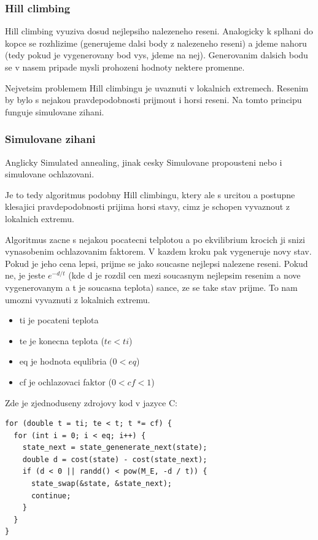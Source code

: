 \documentclass[12pt,a4paper]{article}
\begin{document}
\subsubsection{Hill climbing}
Hill climbing vyuziva dosud nejlepsiho nalezeneho reseni. Analogicky k splhani do kopce se rozhlizime (generujeme dalsi body z nalezeneho reseni) a jdeme nahoru (tedy pokud je vygenerovany bod vys, jdeme na nej). Generovanim dalsich bodu se v nasem pripade mysli prohozeni hodnoty nektere promenne.

Nejvetsim problemem Hill climbingu je uvaznuti v lokalnich extremech. Resenim by bylo s nejakou pravdepodobnosti prijmout i horsi reseni. Na tomto principu funguje simulovane zihani.

\subsubsection{Simulovane zihani}
Anglicky Simulated annealing, jinak cesky Simulovane propousteni nebo i simulovane ochlazovani.

Je to tedy algoritmus podobny Hill climbingu, ktery ale s urcitou a postupne klesajici pravdepodobnosti prijima horsi stavy, cimz je schopen vyvaznout z lokalnich extremu.

Algoritmus zacne s nejakou pocatecni telplotou a po ekvilibrium krocich ji snizi vynasobenim ochlazovanim faktorem. V kazdem kroku pak vygeneruje novy stav. Pokud je jeho cena lepsi, prijme se jako soucasne nejlepsi nalezene reseni. Pokud ne, je jeste $e^{-d/t}$ (kde d je rozdil cen mezi soucasnym nejlepsim resenim a nove vygenerovanym a t je soucasna teplota) sance, ze se take stav prijme. To nam umozni vyvaznuti z lokalnich extremu.

\begin{itemize}
\item ti je pocateni teplota
\item te je konecna teplota ($te < ti$)
\item eq je hodnota equlibria ($0 < eq$)
\item cf je ochlazovaci faktor ($0 < cf < 1$)
\end{itemize}

Zde je zjednoduseny zdrojovy kod v jazyce C:

\begin{lstlisting}[frame=single]
for (double t = ti; te < t; t *= cf) {
  for (int i = 0; i < eq; i++) {
    state_next = state_genenerate_next(state);
    double d = cost(state) - cost(state_next);
    if (d < 0 || randd() < pow(M_E, -d / t)) {
      state_swap(&state, &state_next);
      continue;
    }
  }
}
\end{lstlisting}
\end{document}
